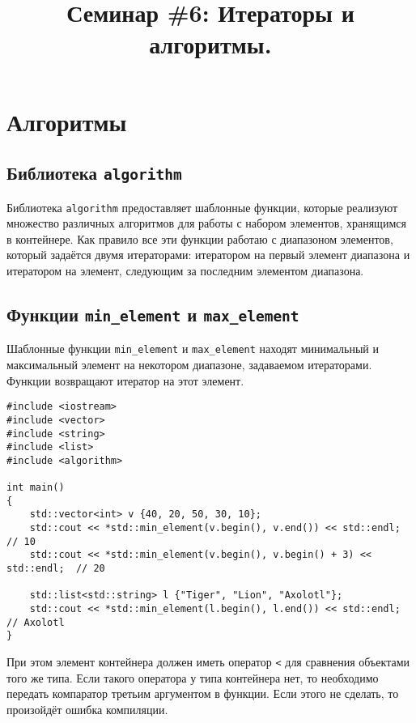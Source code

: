 \documentclass{article}
\begin{document}
\title{Семинар \#6: Итераторы и алгоритмы. \vspace{-5ex}}\date{}\maketitle



\section*{Алгоритмы}

\subsection*{Библиотека \texttt{algorithm}}
Библиотека \texttt{algorithm} предоставляет шаблонные функции, которые реализуют множество различных алгоритмов для работы с набором элементов, хранящимся в контейнере. Как правило все эти функции работаю с диапазоном элементов, который задаётся двумя итераторами: итератором на первый элемент диапазона и итератором на элемент, следующим за последним элементом диапазона. 
\subsection*{Функции \texttt{min\_element} и \texttt{max\_element}}
Шаблонные функции \texttt{min\_element} и \texttt{max\_element} находят минимальный и максимальный элемент на некотором диапазоне, задаваемом итераторами. Функции возвращают итератор на этот элемент.
\begin{lstlisting}
#include <iostream>
#include <vector>
#include <string>
#include <list>
#include <algorithm>

int main()
{
	std::vector<int> v {40, 20, 50, 30, 10};
	std::cout << *std::min_element(v.begin(), v.end()) << std::endl;        // 10
	std::cout << *std::min_element(v.begin(), v.begin() + 3) << std::endl;  // 20
	
	std::list<std::string> l {"Tiger", "Lion", "Axolotl"};
	std::cout << *std::min_element(l.begin(), l.end()) << std::endl;        // Axolotl
}
\end{lstlisting}
При этом элемент контейнера должен иметь оператор \texttt{<} для сравнения объектами того же типа. Если такого оператора у типа контейнера нет, то необходимо передать компаратор третьим аргументом в функции. Если этого не сделать, то произойдёт ошибка компиляции.
\end{document}
